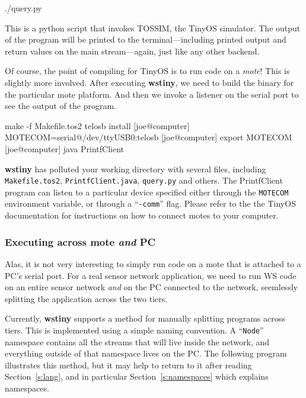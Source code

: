 \documentclass[twocolumn]{report}
\newcommand{\cde}{\tt}
\begin{document}
\begin{code}
   ./query.py
\end{code}

This is a python script that invokes TOSSIM, the TinyOS simulator.
The output of the program will be printed to the terminal---including
printed output and return values on the main stream---again, just like
any other backend.

Of course, the point of compiling for TinyOS is to run code on a {\em
  mote}!  This is slightly more involved.  After executing {\bf
  wstiny}, we need to build the binary for the particular mote
platform.  And then we invoke a listener on the serial port to see the
output of the program.

\begin{code}
 make -f Makefile.tos2 telosb install
[joe@computer] MOTECOM=serial@/dev/ttyUSB0:telosb
[joe@computer] export MOTECOM
[joe@computer] java PrintfClient 
\end{code}


{\bf wstiny} has polluted your working directory with several files,
including  {\tt Makefile.tos2}, {\tt PrintfClient.java}, {\tt query.py} and others.
%
The PrintfClient program can listen to a particular device specified
either through the {\tt MOTECOM} environment variable, or through a
``{\tt -comm}'' flag.  Please refer to the the TinyOS documentation
for instructions on how to connect motes to your computer.

\subsubsection*{Executing across mote {\em and} PC}

Alas, it is not very interesting to simply run code on a mote that is
attached to a PC's serial port.  For a real sensor network
application, we need to run WS code on an entire sensor network {\em
  and} on the PC connected to the network, seemlessly splitting the
application across the two tiers.

Currently, {\bf wstiny} supports a method for manually splitting
programs across tiers.  This is implemented using a simple naming
convention.  A ``{\cde Node}'' namespace contains all the streams that will
live inside the network, and everything outside of that namespace
lives on the PC.  The following program illustrates this method, but
it may help to return to it after reading Section~\ref{s:lang}, and in particular
Section~\ref{s:namespaces} which explains namespaces.
\end{document}
